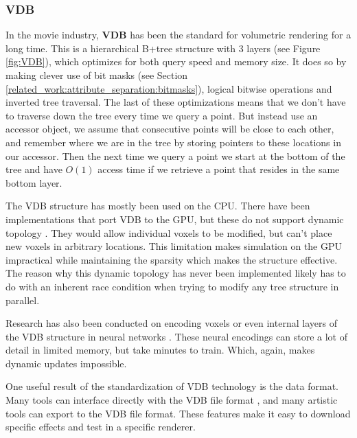 \subsubsection{VDB} \label{related_work:voxel_data_structures:vdb}
In the movie industry, \textbf{VDB} \cite{museth2013vdb} has been the standard for volumetric rendering for a long time. This is a hierarchical B+tree structure with 3 layers (see Figure \ref{fig:VDB}), which optimizes for both query speed and memory size. It does so by making clever use of bit masks (see Section \ref{related_work:attribute_separation:bitmasks}), logical bitwise operations and inverted tree traversal. The last of these optimizations means that we don't have to traverse down the tree every time we query a point. But instead use an accessor object, we assume that consecutive points will be close to each other, and remember where we are in the tree by storing pointers to these locations in our accessor. Then the next time we query a point we start at the bottom of the tree and have $O(1)$ access time if we retrieve a point that resides in the same bottom layer.

The VDB structure has mostly been used on the CPU. There have been implementations that port VDB to the GPU, but these do not support dynamic topology \cite{hoetzlein2016gvdb} \cite{museth2021nanovdb}. They would allow individual voxels to be modified, but can't place new voxels in arbitrary locations. This limitation makes simulation on the GPU impractical while maintaining the sparsity which makes the structure effective. The reason why this dynamic topology has never been implemented likely has to do with an inherent race condition when trying to modify any tree structure in parallel.

Research has also been conducted on encoding voxels or even internal layers of the VDB structure in neural networks \cite{kim2022neuralvdb}. These neural encodings can store a lot of detail in limited memory, but take minutes to train. Which, again, makes dynamic updates impossible.

One useful result of the standardization of VDB technology is the data format. Many tools can interface directly with the VDB file format \cite{VDBADeepDive}, and many artistic tools can export to the VDB file format. These features make it easy to download specific effects and test in a specific renderer.

